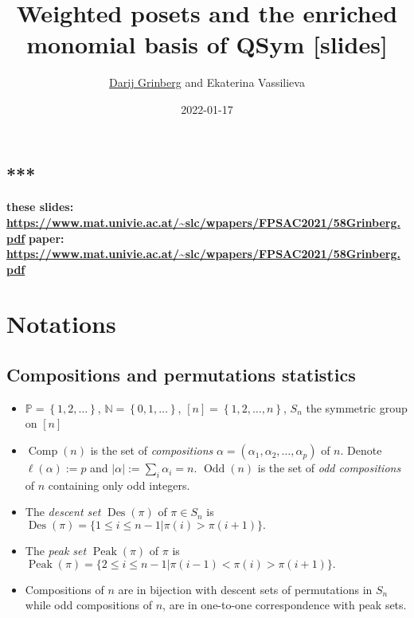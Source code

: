 \documentclass[numbers=enddot,12pt,final,onecolumn,notitlepage]{scrartcl}%
\newcommand{\al}{\alpha}
\newcommand{\NN}{\mathbb{N}} %
\newcommand{\PP}{\mathbb{P}} %
\newcommand{\Des}{\operatorname{Des}}
\newcommand{\Odd}{\operatorname{Odd}}
\newcommand{\Comp}{\operatorname{Comp}}
\newcommand{\Peak}{\operatorname{Peak}}
\newcommand{\0}{\phantom{c}}
\let\sumnonlimits\sum
\renewcommand{\sum}{\sumnonlimits\limits}
\begin{document}
\title{Weighted posets and the enriched monomial basis of QSym [slides]}
\author{\href{http://www.cip.ifi.lmu.de/~grinberg/}{Darij Grinberg} and Ekaterina Vassilieva}
\date{2022-01-17}
\maketitle

\subsection*{***}

\textbf{these slides: \color{red}
\url{https://www.mat.univie.ac.at/~slc/wpapers/FPSAC2021/58Grinberg.pdf}}%
\newline\textbf{paper: \color{red}
\url{https://www.mat.univie.ac.at/~slc/wpapers/FPSAC2021/58Grinberg.pdf}}%
\newline


\section{Notations}

\subsection{Compositions and permutations statistics}

\begin{itemize}
\item $\PP=\left\{1,2,\dots\right\}$, $\NN = \left\{0,1,\ldots\right\}$, $[n] = \left\{1,2,\dots, n\right\}$, $S_n$ the symmetric group on $[n]$
\item $\Comp(n)$ is the set of \emph{compositions} $\al = (\al_1, \al_2, \dots, \al_p)$ of $n$. Denote $\ell(\al) := p$ and $|\al| := \sum_i \al_i = n$. $\Odd(n)$ is the set of \emph{odd compositions} of $n$ containing only odd integers.

\item The \emph{descent set} $\Des(\pi)$ of $\pi \in S_n$ is 
$\Des(\pi) = \{1\leq i\leq n-1| \pi(i)>\pi(i+1)\}.$


\item The \emph{peak set} $\Peak(\pi)$ of $\pi$ is $
\Peak(\pi) = \{2\leq i\leq n-1| \pi(i-1)<\pi(i)>\pi(i+1)\}.$

\item Compositions of $n$ are in bijection with descent sets of permutations in $S_n$ while odd compositions of $n$, are in one-to-one correspondence with peak sets.

\end{itemize}
\end{document}
